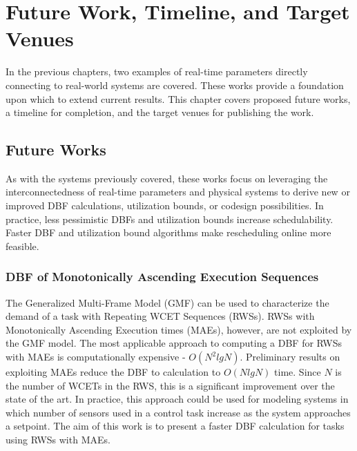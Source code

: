 \section{Future Work, Timeline, and Target Venues} \label{chap:futureWork}

In the previous chapters, two examples of real-time parameters directly connecting to real-world systems are covered.
These works provide a foundation upon which to extend current results.
This chapter covers proposed future works, a timeline for completion, and the target venues for publishing the work.

\subsection{Future Works}

As with the systems previously covered, these works focus on leveraging the interconnectedness of real-time parameters and physical systems to derive new or improved DBF calculations, utilization bounds, or codesign possibilities.
In practice, less pessimistic DBFs and utilization bounds increase schedulability.
Faster DBF and utilization bound algorithms make rescheduling online more feasible.

\subsubsection{DBF of Monotonically Ascending Execution Sequences}

The Generalized Multi-Frame Model (GMF) can be used to characterize the demand of a task with Repeating WCET Sequences (RWSs).
RWSs with Monotonically Ascending Execution times (MAEs), however, are not exploited by the GMF model.
The most applicable approach to computing a DBF for RWSs with MAEs is computationally expensive - $O(N^2 lg N)$.
Preliminary results on exploiting MAEs reduce the DBF to calculation to $O(N lg N)$ time.
Since $N$ is the number of WCETs in the RWS, this is a significant improvement over the state of the art.
In practice, this approach could be used for modeling systems in which number of sensors used in a control task increase as the system approaches a setpoint.
The aim of this work is to present a faster DBF calculation for tasks using RWSs with MAEs.

